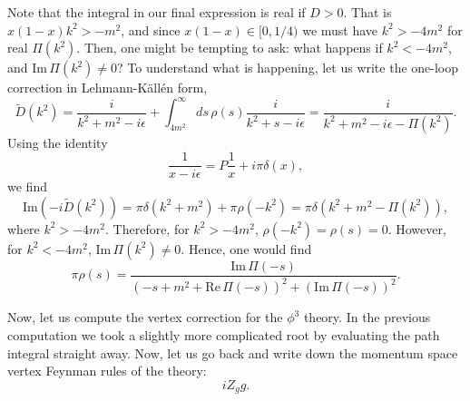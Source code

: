Note that the integral in our final expression is real if $D>0$. That is $x(1-x)k^2>-m^2$, and since $x(1-x) \in[0,1/4)$ we must have $k^2 >-4m^2$ for real $\Pi(k^2)$. Then, one might be tempting to ask: what happens if $k^2 < -4m^2$, and $\text{Im}\,\Pi(k^2)\neq 0$? To understand what is happening, let us write the one-loop correction in Lehmann-Källén form,
\begin{equation}
    \tilde{D}(k^2) = \frac{i}{k^2+m^2-i\epsilon} + \int _{4m^2}^\infty ds \,\rho(s)\frac{i}{k^2+s-i\epsilon} = \frac{i}{k^2 +m^2-i\epsilon - \Pi(k^2)}.
\end{equation}
Using the identity
\begin{equation}
    \frac{1}{x-i\epsilon} = P\frac{1}{x} + i\pi\delta(x),
\end{equation}
we find
\begin{equation}
    \text{Im}(-i\tilde{D}(k^2)) = \pi\delta(k^2+m^2) + \pi\rho(-k^2) = \pi\delta(k^2+m^2-\Pi(k^2)),
\end{equation}
where $k^2 >-4m^2$. Therefore, for $k^2 >-4m^2$, $\rho(-k^2) = \rho(s)= 0$. However, for $k^2 <-4m^2$, $\text{Im}\, \Pi(k^2) \neq 0$. Hence, one would find
\begin{equation}
    \pi\rho(s)  = \frac{\text{Im}\, \Pi(-s)}{(-s+m^2+\text{Re}\, \Pi(-s))^2 + (\text{Im}\, \Pi(-s))^2}.
\end{equation}

Now, let us compute the vertex correction for the $\phi^3$ theory. In the previous computation we took a slightly more complicated root by evaluating the path integral straight away. Now, let us go back and write down the momentum space vertex Feynman rules of the theory:
\begin{equation}
    iZ_gg.
\end{equation}


